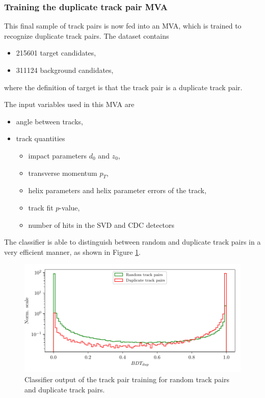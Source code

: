 \documentclass[oneside,a4paper,openany,12pt]{scrbook}
\begin{document}
\subsubsection{Training the duplicate track pair MVA}
\label{ss:trackMVA}

This final sample of track pairs is now fed into an MVA, which is trained to recognize duplicate track pairs. The dataset contains
\begin{itemize}
\item 215601 target candidates,
\item 311124 background candidates,
\end{itemize}
where the definition of target is that the track pair is a duplicate track pair. 

The input variables used in this MVA are
\begin{itemize}
\item angle between tracks,
\item track quantities
	\begin{itemize}
	\item impact parameters $d_0$ and $z_0$,
	\item transverse momentum $p_T$,
	\item helix parameters and helix parameter errors of the track,
	\item track fit $p$-value,
	\item number of hits in the SVD and CDC detectors
	\end{itemize}
\end{itemize}

The classifier is able to distinguish between random and duplicate track pairs in a very efficient manner, as shown in Figure \ref{fig:ROE_dupBDT}.

\begin{figure}[H]
\centering
\captionsetup{width=0.8\linewidth}
\includegraphics[width=\linewidth]{fig/ROECleanup_dup}
\caption{Classifier output of the track pair training for random track pairs and duplicate track pairs.}
\label{fig:ROE_dupBDT}
\end{figure}
\end{document}
